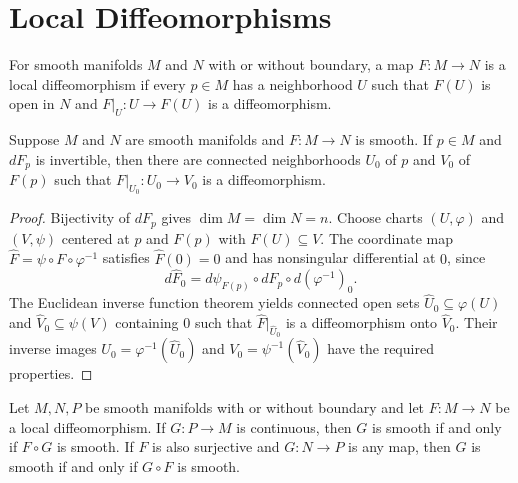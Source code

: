 
\section{Local Diffeomorphisms}

\begin{definition}
\label{def:4-22-extra-1}




For smooth manifolds $M$ and $N$ with or without boundary, a map $F:M\to N$ is a local diffeomorphism if every $p\in M$ has a neighborhood $U$ such that $F(U)$ is open in $N$ and $F|_U:U\to F(U)$ is a diffeomorphism.
\end{definition}

\begin{theorem}
\label{thm:4-5}




Suppose $M$ and $N$ are smooth manifolds and $F:M\to N$ is smooth. If $p\in M$ and $dF_p$ is invertible, then there are connected neighborhoods $U_0$ of $p$ and $V_0$ of $F(p)$ such that $F|_{U_0}:U_0\to V_0$ is a diffeomorphism.
\end{theorem}

\begin{proof}

\sketch
Bijectivity of $dF_p$ gives $\dim M=\dim N=n$. Choose charts $(U,\varphi)$ and $(V,\psi)$ centered at $p$ and $F(p)$ with $F(U)\subseteq V$. The coordinate map $\widehat F=\psi\circ F\circ\varphi^{-1}$ satisfies $\widehat F(0)=0$ and has nonsingular differential at $0$, since
\[
d\widehat F_0=d\psi_{F(p)}\circ dF_p\circ d(\varphi^{-1})_0.
\]
The Euclidean inverse function theorem yields connected open sets $\widehat U_0\subseteq\varphi(U)$ and $\widehat V_0\subseteq\psi(V)$ containing $0$ such that $\widehat F|_{\widehat U_0}$ is a diffeomorphism onto $\widehat V_0$. Their inverse images $U_0=\varphi^{-1}(\widehat U_0)$ and $V_0=\psi^{-1}(\widehat V_0)$ have the required properties.
\end{proof}

\begin{proposition}
\label{exer:4-10}




Let $M,N,P$ be smooth manifolds with or without boundary and let $F:M\to N$ be a local diffeomorphism. If $G:P\to M$ is continuous, then $G$ is smooth if and only if $F\circ G$ is smooth. If $F$ is also surjective and $G:N\to P$ is any map, then $G$ is smooth if and only if $G\circ F$ is smooth.
\end{proposition}

